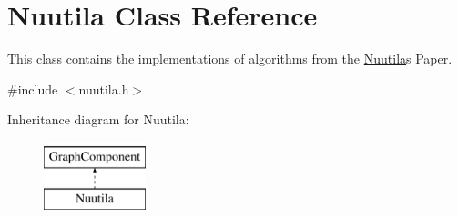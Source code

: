 \hypertarget{class_nuutila}{}\section{Nuutila Class Reference}
\label{class_nuutila}


This class contains the implementations of algorithms from the \hyperlink{class_nuutila}{Nuutila}\textquotesingle{}s Paper.  




{\ttfamily \#include $<$nuutila.\+h$>$}

Inheritance diagram for Nuutila\+:\begin{figure}[H]
\begin{center}
\leavevmode
\includegraphics[height=2.000000cm]{class_nuutila}
\end{center}
\end{figure}
